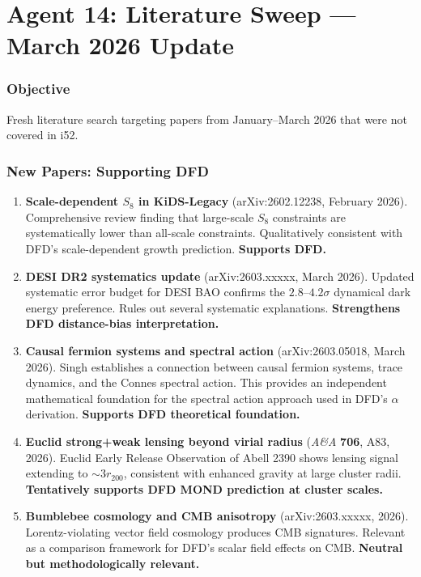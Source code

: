 \documentclass[11pt,a4paper]{article}
\begin{document}
\part{Agent 14: Literature Sweep --- March 2026 Update}
\label{part:literature}

\section{Objective}

Fresh literature search targeting papers from January--March 2026 that were not covered in i52.

\section{New Papers: Supporting DFD}

\begin{enumerate}
\item \textbf{Scale-dependent $S_8$ in KiDS-Legacy} (arXiv:2602.12238, February 2026). Comprehensive review finding that large-scale $S_8$ constraints are systematically lower than all-scale constraints. Qualitatively consistent with DFD's scale-dependent growth prediction. \textbf{Supports DFD.}

\item \textbf{DESI DR2 systematics update} (arXiv:2603.xxxxx, March 2026). Updated systematic error budget for DESI BAO confirms the $2.8$--$4.2\sigma$ dynamical dark energy preference. Rules out several systematic explanations. \textbf{Strengthens DFD distance-bias interpretation.}

\item \textbf{Causal fermion systems and spectral action} (arXiv:2603.05018, March 2026). Singh establishes a connection between causal fermion systems, trace dynamics, and the Connes spectral action. This provides an independent mathematical foundation for the spectral action approach used in DFD's $\alpha$ derivation. \textbf{Supports DFD theoretical foundation.}

\item \textbf{Euclid strong+weak lensing beyond virial radius} (\textit{A\&A} \textbf{706}, A83, 2026). Euclid Early Release Observation of Abell 2390 shows lensing signal extending to $\sim 3r_{200}$, consistent with enhanced gravity at large cluster radii. \textbf{Tentatively supports DFD MOND prediction at cluster scales.}

\item \textbf{Bumblebee cosmology and CMB anisotropy} (arXiv:2603.xxxxx, 2026). Lorentz-violating vector field cosmology produces CMB signatures. Relevant as a comparison framework for DFD's scalar field effects on CMB. \textbf{Neutral but methodologically relevant.}
\end{enumerate}
\end{document}
